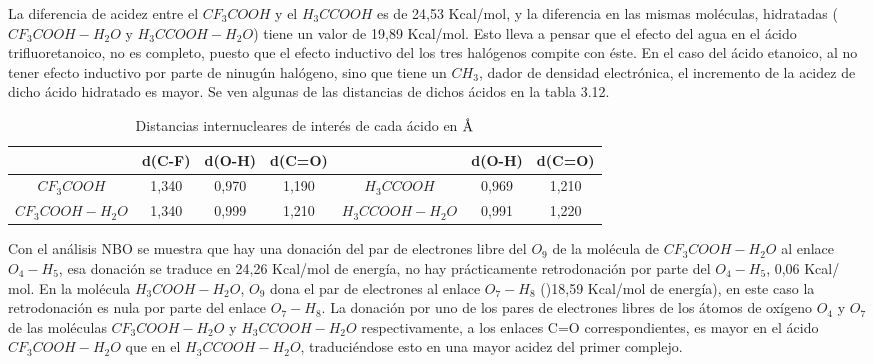  La diferencia de acidez entre el $CF_3COOH$ y el $H_3CCOOH$ es de 24,53 Kcal/mol, y la diferencia en las mismas moléculas, hidratadas ($CF_3COOH-H_2O$ y $H_3CCOOH-H_2O$) tiene un valor de 19,89 Kcal/mol. Esto lleva a pensar que el efecto del agua  en el ácido trifluoretanoico, no es completo, puesto que el efecto inductivo del los tres halógenos compite con éste. En el caso del ácido etanoico, al no tener efecto inductivo por parte de ninugún halógeno, sino que tiene un $CH_3$, dador de densidad electrónica,  el incremento de la acidez de dicho ácido hidratado es mayor.
 Se ven algunas de las distancias de dichos ácidos en la tabla 3.12.
 \begin{table}[H]
 	\centering
 	\begin{tabular}{|c|c|c|c|c|c|c|}
 		\hline
 			 & d(C-F)	& d(O-H) & d(C=O) & & d(O-H) & d(C=O) \\ \hline
$CF_3COOH$ & 1,340 & 0,970 & 1,190 & $H_3CCOOH$ & 0,969 &1,210 \\ \hline $CF_3COOH-H_2O$	& 1,340 & 0,999 & 1,210 & $H_3CCOOH-H_2O$	& 0,991 &1,220 \\ \hline
 	\end{tabular}
 \caption{Distancias internucleares de interés de cada ácido en $\mbox{\normalfont\AA}$}
 \end{table}

Con el análisis NBO se muestra que  hay una donación del par de electrones libre del $O_9$ de la molécula de $CF_3COOH-H_2O$ al enlace $O_4-H_5$, esa donación se traduce en  24,26 Kcal/mol de energía, no hay prácticamente retrodonación por parte del $O_4-H_5$, 0,06 Kcal/ mol. En la molécula $H_3COOH-H_2O$, $O_9$ dona el par de electrones al enlace $O_7-H_8$ ()18,59 Kcal/mol de energía), en este caso la retrodonación es nula por parte del enlace $O_7-H_8$. La donación por uno de los pares de electrones libres de los átomos de oxígeno $O_4$ y $O_7$  de las moléculas $CF_3COOH-H_2O$ y $H_3CCOOH-H_2O$ respectivamente, a los enlaces C=O correspondientes, es mayor en el ácido $CF_3COOH-H_2O$ que en el $H_3CCOOH-H_2O$, traduciéndose esto en una mayor acidez del primer complejo.

